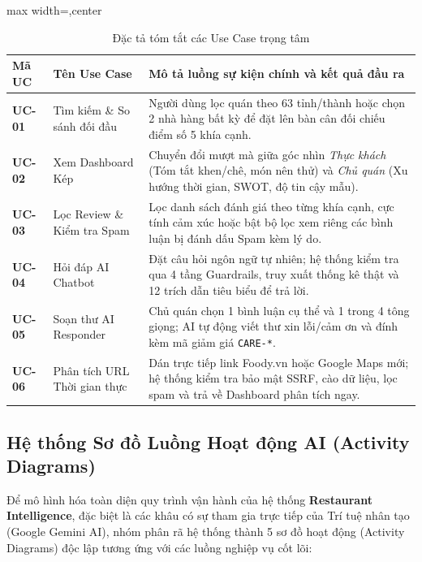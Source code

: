 \documentclass[12pt, a4paper]{article}
\begin{document}
\begin{table}[!htbp]
\centering
\caption{Đặc tả tóm tắt các Use Case trọng tâm}
\vspace{0.15cm}
\footnotesize
\begin{adjustbox}{max width=\textwidth,center}
\begin{tabularx}{0.97\textwidth}{l l X}
\toprule
\rowcolor{blue!8}
\textbf{Mã UC} & \textbf{Tên Use Case} & \textbf{Mô tả luồng sự kiện chính và kết quả đầu ra} \\
\midrule
\textbf{UC-01} & Tìm kiếm \& So sánh đối đầu & Người dùng lọc quán theo 63 tỉnh/thành hoặc chọn 2 nhà hàng bất kỳ để đặt lên bàn cân đối chiếu điểm số 5 khía cạnh. \\
\textbf{UC-02} & Xem Dashboard Kép & Chuyển đổi mượt mà giữa góc nhìn \textit{Thực khách} (Tóm tắt khen/chê, món nên thử) và \textit{Chủ quán} (Xu hướng thời gian, SWOT, độ tin cậy mẫu). \\
\textbf{UC-03} & Lọc Review \& Kiểm tra Spam & Lọc danh sách đánh giá theo từng khía cạnh, cực tính cảm xúc hoặc bật bộ lọc xem riêng các bình luận bị đánh dấu Spam kèm lý do. \\
\textbf{UC-04} & Hỏi đáp AI Chatbot & Đặt câu hỏi ngôn ngữ tự nhiên; hệ thống kiểm tra qua 4 tầng Guardrails, truy xuất thống kê thật và 12 trích dẫn tiêu biểu để trả lời. \\
\textbf{UC-05} & Soạn thư AI Responder & Chủ quán chọn 1 bình luận cụ thể và 1 trong 4 tông giọng; AI tự động viết thư xin lỗi/cảm ơn và đính kèm mã giảm giá \texttt{CARE-*}. \\
\textbf{UC-06} & Phân tích URL Thời gian thực & Dán trực tiếp link Foody.vn hoặc Google Maps mới; hệ thống kiểm tra bảo mật SSRF, cào dữ liệu, lọc spam và trả về Dashboard phân tích ngay. \\
\bottomrule
\end{tabularx}
\end{adjustbox}
\end{table}

\newpage
\subsection{Hệ thống Sơ đồ Luồng Hoạt động AI (Activity Diagrams)}
Để mô hình hóa toàn diện quy trình vận hành của hệ thống \textbf{Restaurant Intelligence}, đặc biệt là các khâu có sự tham gia trực tiếp của Trí tuệ nhân tạo (Google Gemini AI), nhóm phân rã hệ thống thành 5 sơ đồ hoạt động (Activity Diagrams) độc lập tương ứng với các luồng nghiệp vụ cốt lõi:
\end{document}
